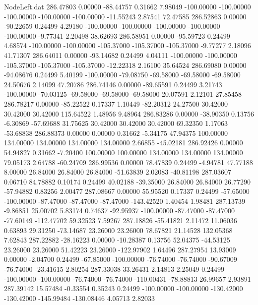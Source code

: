 \begin{filecontents}{NodeLeft.dat}
 286.47803    0.00000  -88.44757     0.31662    7.98049 -100.00000 -100.00000 -100.00000 -100.00000 -100.00000  -11.55243    2.87541   72.47585
 286.52863    0.00000  -90.22659     0.24499    4.29180 -100.00000 -100.00000 -100.00000 -100.00000 -100.00000   -9.77341    2.20498   38.62693
 286.58951    0.00000  -95.59723     0.24499    4.68574 -100.00000 -100.00000 -105.37000 -105.37000 -105.37000   -9.77277    2.18096   41.71307
 286.64011    0.00000  -93.14682     0.24499    4.04111 -100.00000 -100.00000 -105.37000 -105.37000 -105.37000  -12.22318    2.16100   35.64524
 286.69080    0.00000  -94.08676     0.24499    5.40199 -100.00000  -79.08750  -69.58000  -69.58000  -69.58000   24.50676    2.14099   47.20786
 286.74146    0.00000  -89.65591     0.24499    3.21743 -100.00000  -70.03125  -69.58000  -69.58000  -69.58000   20.07591    2.12101   27.85458
 286.78217    0.00000  -85.22522     0.17337    1.10449  -82.20312   24.27500   30.42000   30.42000   30.42000  115.64522    1.48956    9.48964
 286.83286    0.00000  -38.90350     0.13756   -6.30869  -57.69688   31.75625   30.42000   30.42000   30.42000   69.32350    1.17063  -53.68838
 286.88373    0.00000    0.00000     0.31662   -5.34175   47.94375  100.00000  134.00000  134.00000  134.00000  134.00000    2.66855  -45.02181
 286.92426    0.00000   54.94827     0.31662   -7.20400  100.00000  100.00000  134.00000  134.00000  134.00000   79.05173    2.64788  -60.24709
 286.99536    0.00000   78.47839     0.24499   -4.94781   47.77188    8.00000   26.84000   26.84000   26.84000  -51.63839    2.02083  -40.81198
 287.03607    0.06710   84.78882     0.10174    0.24499   40.02188  -39.35000   26.84000   26.84000   26.77290  -57.94882    0.83256    2.00477
 287.08667    0.00000   55.95520     0.17337    0.24499  -57.65000 -100.00000  -87.47000  -87.47000  -87.47000 -143.42520    1.40454    1.98481
 287.13739   -9.86851   25.00702     5.83174    0.74637  -92.95937 -100.00000  -87.47000  -87.47000  -77.60149 -112.47702   59.32523    7.59267
 287.18826  -55.41821    2.11472    11.06036    0.63893   29.31250  -73.14687   23.26000   23.26000   78.67821   21.14528  132.05368    7.62843
 287.22882  -28.16223    0.00000   -10.28387    0.13756   52.04375  -44.53125   23.26000   23.26000   51.42223   23.26000 -122.97902    1.64496
 287.27954   13.93009    0.00000    -2.04700    0.24499  -67.85000 -100.00000  -76.74000  -76.74000  -90.67009  -76.74000  -23.41615    2.80254
 287.33038   33.26431    2.14813     2.25049    0.24499 -100.00000 -100.00000  -76.74000  -76.74000 -110.00431  -78.88813   26.99657    2.93891
 287.39142   15.57484   -0.33554     0.35243    0.24499 -100.00000 -100.00000 -130.42000 -130.42000 -145.99484 -130.08446    4.05713    2.82033

\end{filecontents}
